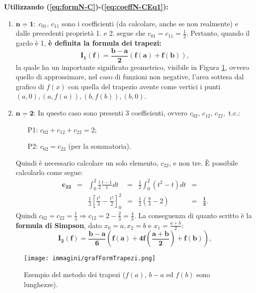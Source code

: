 \textbf{Utilizzando (\ref{eq:formN-C})-(\ref{eq:coeffN-CEq1}):}
\begin{enumerate}
    \item $\boldsymbol{\underline{n=1}}:\; c_{01},\, c_{11}$ sono i coefficienti (da calcolare, anche se non realmente) e dalle precedenti proprietà 1. e 2. segue che $c_{01}=c_{11}=\frac{1}{2}.$ Pertanto, quando il gardo è 1, \textbf{è definita la formula dei trapezi:}
    \begin{equation}\label{eq:formTrapezi}
        \boxed{\boldsymbol{I_1(f)=\frac{b-a}{2}(f(a)+f(b))},}
    \end{equation}
    la quale ha un importante significato geometrico, visibile in Figura \ref{fig:grafFormTrapezi}, ovvero quello di approssimare, nel caso di funzioni non negative, l'area sottesa dal grafico di $f(x)$ con quella del trapezio avente come vertici i punti $(a,0),(a,f(a)),(b,f(b)),(b,0)$.
    \item $\boldsymbol{\underline{n=2}}$: In questo caso sono presenti 3 coefficienti, ovvero $c_{02},\, c_{12}, \,c_{22},$ t.c.:
    \begin{enumerate}
        \item[P1:] $c_{02}+c_{12}+c_{22}=2$;
        \item[P2:] $c_{02}=c_{22}$ (per la sommatoria).
    \end{enumerate}
    Quindi è necessario calcolare un solo elemento, $c_{22}$, e non tre. È possibile calcolarlo come segue:
    \begin{equation*}
        \begin{matrix}
            \boldsymbol{c_{22}}&=&\int_0^2\frac{t}{2}\frac{t-1}{1}dt&=&\frac{1}{2}\int_0^2(t^2-t)dt&=&\\
            &&\frac{1}{2}\left[\frac{t^3}{3}-\frac{t^2}{2}\right]_0^2&=&\frac{1}{2}\left(\frac{8}{3}-2\right)&=&\boldsymbol{\frac{1}{3}}.
        \end{matrix}
    \end{equation*}
    Quindi $c_{02}=c_{22}=\frac{1}{3}\Rightarrow c_{12}=2-\frac{2}{3}=\frac{4}{3}$.
    La conseguenza di quanto scritto è la \textbf{formula di Simpson}, dato $x_0=a, x_2=b$ e $x_1=\frac{a+b}{2}$:
    \begin{equation}\label{eq:formSimpson}
        \boxed{\boldsymbol{I_2(f)=\frac{b-a}{6}\left(f(a)+4f\left(\frac{a+b}{2}\right)+f(b)\right)},}
    \end{equation}
\end{enumerate}

\begin{figure}
    \centering
    \texttt{[image: immagini/grafFormTrapezi.png]}
    \caption{Esempio del metodo dei trapezi ($f(a)$, $b-a$ ed $f(b)$ sono lunghezze).}\label{fig:grafFormTrapezi}
\end{figure}

